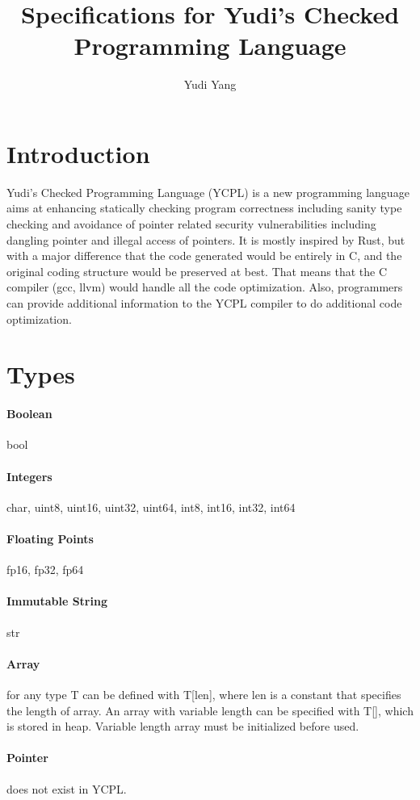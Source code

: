 \documentclass[12pt, a4paper]{IEEEtran}
\title{Specifications for Yudi's Checked Programming Language}
\author{Yudi Yang}
\begin{document}
\maketitle

\section{Introduction}
	Yudi's Checked Programming Language (YCPL) is a new programming language aims at enhancing statically checking program correctness including sanity type checking and avoidance of pointer related security vulnerabilities including dangling pointer and illegal access of pointers. It is mostly inspired by Rust, but with a major difference that the code generated would be entirely in C, and the original coding structure would be preserved at best. That means that the C compiler (gcc, llvm) would handle all the code optimization. Also, programmers can provide additional information to the YCPL compiler to do additional code optimization.

\section{Types}
	\paragraph{Boolean} bool
	\paragraph{Integers} char, uint8, uint16, uint32, uint64, int8, int16, int32, int64
	\paragraph{Floating Points} fp16, fp32, fp64
	\paragraph{Immutable String} str
	\paragraph{Array} for any type T can be defined with T[len], where len is a constant that specifies the length of array. An array with variable length can be specified with T[], which is stored in heap. Variable length array must be initialized before used.
	\paragraph{Pointer} does not exist in YCPL.
\end{document}
